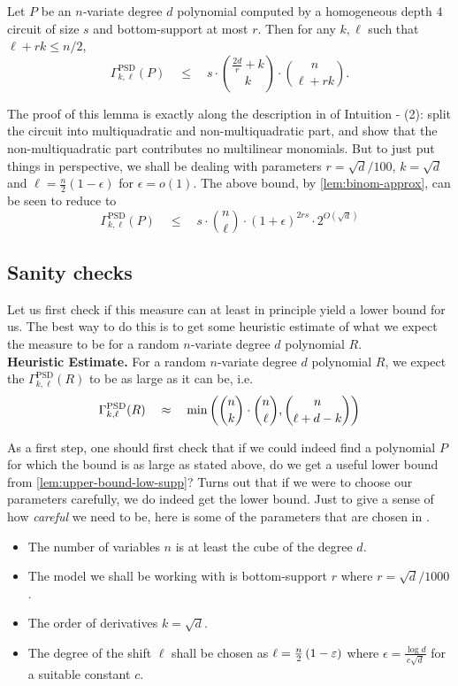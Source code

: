 \begin{lemma}\label{lem:upper-bound-low-supp}
Let $P$ be an $n$-variate degree $d$ polynomial computed by a homogeneous depth $4$ circuit of size $s$ and bottom-support at most $r$. 
Then for any $k,\ell$ such that $\ell + rk \leq n/2$, 
\[
\Gamma^{\mathrm{PSD}}_{k,\ell}(P) \quad \leq \quad s \cdot \binom{\frac{2d}{r}+k}{k}\cdot \binom{n}{\ell+rk}. 
\]
\end{lemma}

The proof of this lemma is exactly along the description in of Intuition - (2): split the circuit into multiquadratic and non-multiquadratic part, and show that the non-multiquadratic part contributes no multilinear monomials. 
But to just put things in perspective, we shall be dealing with parameters $r = \sqrt{d}/100$, $k = \sqrt{d}$ and $\ell = \frac{n}{2}(1 - \epsilon)$ for $\epsilon = o(1)$. 
The above bound, by \autoref{lem:binom-approx}, can be seen to reduce to
\[
\Gamma^{\mathrm{PSD}}_{k,\ell}(P) \quad \leq \quad s \cdot \binom{n}{\ell} \cdot (1+\epsilon)^{2rs} \cdot 2^{O(\sqrt{d})}
\]


\subsection*{Sanity checks}

Let us first check if this measure can at least in principle yield a lower bound for us. 
The best way to do this is to get some heuristic estimate of what we expect the measure to be for a random $n$-variate degree $d$ polynomial $R$. \\

{\bf Heuristic Estimate. } For a random $n$-variate degree $d$ polynomial $R$, we expect the $\Gamma^{\mathrm{PSD}}_{k,\ell}(R)$ to be as large as it can be, i.e.
\[
\Gamma^{\mathrm{PSD}}_{k,\ell}(R) \quad \approx \quad \min\left(\binom{n}{k}\cdot \binom{n}{\ell}, \binom{n}{\ell + d-k}\right)
\]

As a first step, one should first check that if we could indeed find a polynomial $P$ for which the bound is as large as stated above, do we get a useful lower bound from \autoref{lem:upper-bound-low-supp}? Turns out that if we were to choose our parameters carefully, we do indeed get the lower bound. 
Just to give a sense of how \emph{careful} we need to be, here is some of the parameters that are chosen in \cite{KLSS,KS14}. 

\begin{itemize}
\item The number of variables $n$ is at least the cube of the degree $d$. 
\item The model we shall be working with is bottom-support $r$ where $r = \sqrt{d}/1000$. 
\item The order of derivatives $k = \sqrt{d}$. 
\item The degree of the shift $\ell$ shall be chosen as $\ell = \frac{n}{2}\left(1 - \varepsilon\right)$ where $\epsilon = \frac{\log d}{c\sqrt{d}}$ for a suitable constant $c$. 
\end{itemize}

